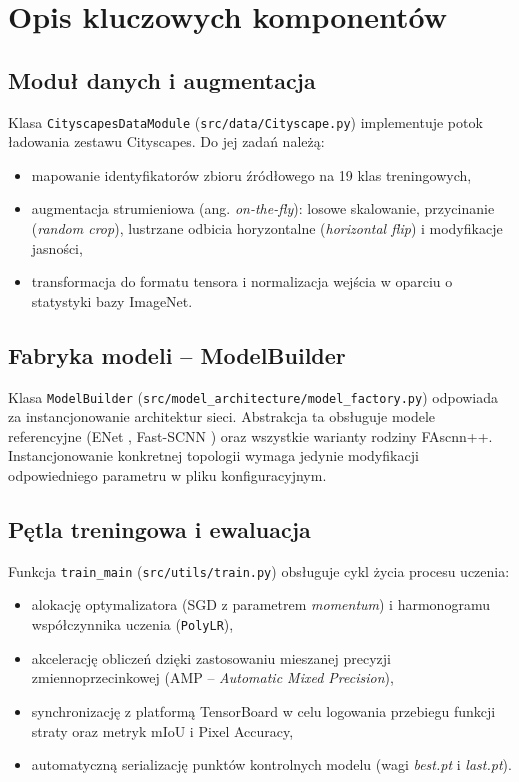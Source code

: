 \section{Opis kluczowych komponentów}

\subsection{Moduł danych i augmentacja}
Klasa \texttt{CityscapesDataModule} (\texttt{src/data/Cityscape.py}) implementuje potok ładowania zestawu Cityscapes. Do jej zadań należą:
\begin{itemize}
    \item mapowanie identyfikatorów zbioru źródłowego na 19 klas treningowych,
    \item augmentacja strumieniowa (ang. \textit{on-the-fly}): losowe skalowanie, przycinanie (\textit{random crop}), lustrzane odbicia horyzontalne (\textit{horizontal flip}) i modyfikacje jasności,
    \item transformacja do formatu tensora i normalizacja wejścia w oparciu o statystyki bazy ImageNet.
\end{itemize}

\subsection{Fabryka modeli – ModelBuilder}
Klasa \texttt{ModelBuilder} (\texttt{src/model\_architecture/model\_factory.py}) odpowiada za instancjonowanie architektur sieci. Abstrakcja ta obsługuje modele referencyjne (ENet , Fast-SCNN ) oraz wszystkie warianty rodziny FAscnn++. Instancjonowanie konkretnej topologii wymaga jedynie modyfikacji odpowiedniego parametru w pliku konfiguracyjnym.

\subsection{Pętla treningowa i ewaluacja}
Funkcja \texttt{train\_main} (\texttt{src/utils/train.py}) obsługuje cykl życia procesu uczenia:
\begin{itemize}
    \item alokację optymalizatora (SGD z parametrem \textit{momentum}) i harmonogramu współczynnika uczenia (\texttt{PolyLR}),
    \item akcelerację obliczeń dzięki zastosowaniu mieszanej precyzji zmiennoprzecinkowej (AMP – \textit{Automatic Mixed Precision}),
    \item synchronizację z platformą TensorBoard w celu logowania przebiegu funkcji straty oraz metryk mIoU i Pixel Accuracy,
    \item automatyczną serializację punktów kontrolnych modelu (wagi \textit{best.pt} i \textit{last.pt}).
\end{itemize}

